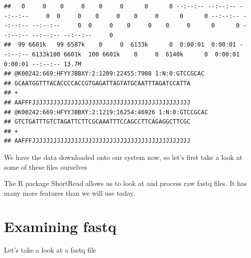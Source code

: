 \documentclass[
]{book}
\newenvironment{Shaded}{\begin{snugshade}}{\end{snugshade}}
\newcommand{\AttributeTok}[1]{\textcolor[rgb]{0.13,0.29,0.53}{#1}}
\newcommand{\CommentTok}[1]{\textcolor[rgb]{0.56,0.35,0.01}{\textit{#1}}}
\newcommand{\ControlFlowTok}[1]{\textcolor[rgb]{0.13,0.29,0.53}{\textbf{#1}}}
\newcommand{\DecValTok}[1]{\textcolor[rgb]{0.00,0.00,0.81}{#1}}
\newcommand{\FunctionTok}[1]{\textcolor[rgb]{0.13,0.29,0.53}{\textbf{#1}}}
\newcommand{\NormalTok}[1]{#1}
\newcommand{\OtherTok}[1]{\textcolor[rgb]{0.56,0.35,0.01}{#1}}
\newcommand{\SpecialCharTok}[1]{\textcolor[rgb]{0.81,0.36,0.00}{\textbf{#1}}}
\newcommand{\StringTok}[1]{\textcolor[rgb]{0.31,0.60,0.02}{#1}}
\begin{document}
\begin{verbatim}
##   0     0    0     0    0     0      0      0 --:--:-- --:--:-- --:--:--     0  0     0    0     0    0     0      0      0 --:--:-- --:--:-- --:--:--     0  0     0    0     0    0     0      0      0 --:--:-- --:--:-- --:--:--     0
##  99 6601k   99 6587k    0     0  6133k      0  0:00:01  0:00:01 --:--:-- 6133k100 6601k  100 6601k    0     0  6140k      0  0:00:01  0:00:01 --:--:-- 13.7M
## @K00242:669:HFYYJBBXY:2:1209:22455:7908 1:N:0:GTCCGCAC
## GCAATGGTTTACACCCCACCGTGAGATTAGTATGCAATTTAGATCCATTA
## +
## AAFFFJJJJJJJJJJJJJJJJJJJJJJJJJJJJJJJJJJJJJJJJJJJJJ
## @K00242:669:HFYYJBBXY:2:1219:16254:46926 1:N:0:GTCCGCAC
## GTCTGATTTGTCTAGATTCTTCGCAAATTTCCAGCCTTCAGAGGCTTCGC
## +
## AAFFFJJJJJJJJJJJJJJJJJJJJJJJJJJJJJJJJJJJJJJJJJJJJJ
\end{verbatim}

We have the data downloaded onto our system now, so let's first take a look at some of these files ourselves

The R package ShortRead allows us to look at and process raw fastq files. It has many more features than we will use today.

\hypertarget{examining-fastq}{%
\section{Examining fastq}\label{examining-fastq}}

Let's take a look at a fastq file

\begin{Shaded}
\end{Shaded}
\end{document}
